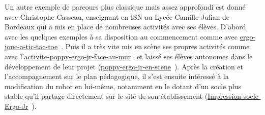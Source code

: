            Un autre exemple de parcours plus classique mais assez approfondi est donné avec Christophe Casseau, enseignant en ISN au Lycée Camille Julian de Bordeaux qui a mis en place de nombreuses activités avec ses élèves. D'abord avec les quelques exemples à sa disposition au commencement comme avec \href{https://www.poppy-education.org/2017/02/13/ergo-joue-a-tic-tac-toe/}{ergo-joue-a-tic-tac-toe}~. Puis il a très vite mis en scène ses propres activités comme avec l'\href{https://forum.poppy-project.org/t/activite-poppy-ergo-jr-face-au-mur/2809}{activite-poppy-ergo-jr-face-au-mur}~ et laissé ses élèves autonomes dans le développement de leur projet (\href{https://www.poppy-education.org/2017/03/24/poppy-ergo-jr-en-scene/}{poppy-ergo-jr-en-scene}~). Après la création et l'accompagnement sur le plan pédagogique, il s'est ensuite intéressé à la modification du robot en lui-même, notamment en le dotant d'un socle plus stable qu'il partage directement sur le site de son établissement (\href{http://isncaju.wixsite.com/isncaju/single-post/2018/01/18/Impression-socle-Ergo-Jr}{Impression-socle-Ergo-Jr}~).
